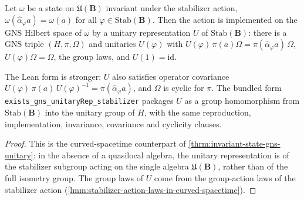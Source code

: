 \begin{theorem}
    \label{thrm:gns-unitary-stabilizer-in-curved-spacetime}
    \leanok
    Let $\omega$ be a state on $\mathfrak{U}(\mathbf{B})$ invariant under the stabilizer action, $\omega(\hat\alpha_\varphi a) = \omega(a)$ for all $\varphi \in \mathrm{Stab}(\mathbf{B})$. Then the action is implemented on the GNS Hilbert space of $\omega$ by a unitary representation $U$ of $\mathrm{Stab}(\mathbf{B})$: there is a GNS triple $(H, \pi, \Omega)$ and unitaries $U(\varphi)$ with $U(\varphi)\,\pi(a)\Omega = \pi(\hat\alpha_\varphi a)\,\Omega$, $U(\varphi)\Omega = \Omega$, the group laws, and $U(1) = \mathrm{id}$.

    The Lean form is stronger: $U$ also satisfies operator covariance $U(\varphi)\,\pi(a)\,U(\varphi)^{-1} = \pi(\hat\alpha_\varphi a)$, and $\Omega$ is cyclic for $\pi$. The bundled form \texttt{exists\_gns\_unitaryRep\_stabilizer} packages $U$ as a group homomorphism from $\mathrm{Stab}(\mathbf{B})$ into the unitary group of $H$, with the same reproduction, implementation, invariance, covariance and cyclicity clauses.
\end{theorem}
\begin{proof}
    \leanok
    This is the curved-spacetime counterpart of \ref{thrm:invariant-state-gns-unitary}: in the absence of a quasilocal algebra, the unitary representation is of the stabilizer subgroup acting on the single algebra $\mathfrak{U}(\mathbf{B})$, rather than of the full isometry group. The group laws of $U$ come from the group-action laws of the stabilizer action (\ref{lmm:stabilizer-action-laws-in-curved-spacetime}).
\end{proof}

